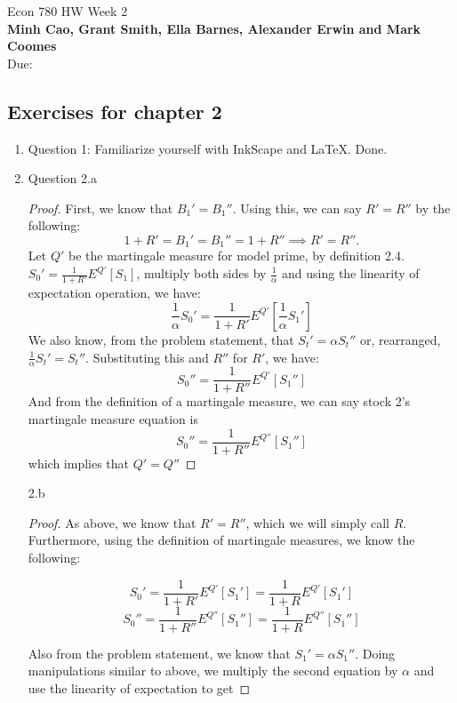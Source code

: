 \documentclass[]{book}
\theoremstyle{definition}
\begin{document}
\begin{center}
{\Large Econ 780 \hspace{0.5cm} HW Week 2}\\
\textbf{Minh Cao, Grant Smith, Ella Barnes, Alexander Erwin and Mark Coomes}\\ %
Due:  %
\end{center}

\vspace{0.2 cm}


\subsection*{Exercises for chapter 2}

\begin{enumerate}
\item Question 1:  Familiarize yourself with InkScape and LaTeX. Done.
\item
Question 2.a

\begin{proof}
    First, we know that ${B_1}'={B_1}''$. Using this, we can say $R'=R''$ by the following:
    $$1+R'={B_1}'={B_1}''=1+R'' \implies R'=R''.$$
    Let $Q'$ be the martingale measure for model prime, by definition 2.4. ${S_0}'= \frac{1}{1+R'}E^{Q'}[S_1]$, multiply both sides by $\frac{1}{\alpha}$ and using the linearity of expectation operation, we have:\\
    $$\frac{1}{\alpha}{S_0}'= \frac{1}{1+R'}E^{Q'}[\frac{1}{\alpha}{S_1}']$$
    We also know, from the problem statement, that ${S_t}'=\alpha {S_t}''$ or, rearranged, $\frac{1}{\alpha} {S_t}'={S_t}''$. Substituting this and $R''$ for $R'$, we have:
    $${S_0}''= \frac{1}{1+R''}E^{Q'}[{S_1}'']$$
    And from the definition of a martingale measure, we can say stock 2's martingale measure equation is
    $${S_0}''= \frac{1}{1+R''}E^{Q''}[{S_1}'']$$
    which implies that $Q' = Q''$ 
\end{proof}

2.b
\begin{proof}
As above, we know that $R'=R''$, which we will simply call $R$. Furthermore, using the definition of martingale measures, we know the following:

$${S_0}'= \frac{1}{1+R'}E^{Q'}[{S_1}']=\frac{1}{1+R}E^{Q'}[{S_1}']$$
$${S_0}''= \frac{1}{1+R''}E^{Q''}[{S_1}'']= \frac{1}{1+R}E^{Q''}[{S_1}'']$$

Also from the problem statement, we know that ${S_1}' = \alpha{S_1}'' $. Doing manipulations similar to above, we multiply the second equation by $\alpha$ and use the linearity of expectation to get 


\end{proof}
\end{enumerate}
\end{document}
